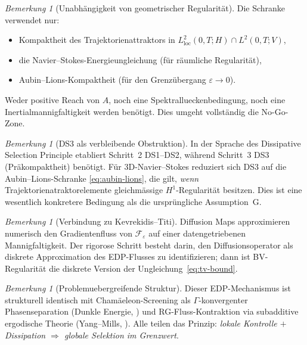 \documentclass[12pt,a4paper]{article}
\theoremstyle{definition}
\theoremstyle{plain}
\theoremstyle{remark}
\newtheorem{remark}[definition]{Bemerkung}
\begin{document}
\begin{remark}[Unabh\"angigkeit von geometrischer Regularit\"at]\label{rem:no-reach-needed}
Die Schranke verwendet nur:
\begin{itemize}
\item Kompaktheit des Trajektorienattraktors in $L^2_{\mathrm{loc}}(0,T;H) \cap L^2(0,T;V)$,
\item die Navier--Stokes-Energieungleichung (f\"ur r\"aumliche Regularit\"at),
\item Aubin--Lions-Kompaktheit (f\"ur den Grenz\"ubergang $\varepsilon \to 0$).
\end{itemize}
Weder positive Reach von $A$, noch eine Spektrallueckenbedingung, noch eine Inertialmannigfaltigkeit werden ben\"otigt. Dies umgeht vollst\"andig die No-Go-Zone.
\end{remark}

\begin{remark}[DS3 als verbleibende Obstruktion]\label{rem:ds3-ns}
In der Sprache des Dissipative Selection Principle \cite{FST-Unified2026} etabliert Schritt~2 DS1--DS2, w\"ahrend Schritt~3 DS3 (Pr\"akompaktheit) ben\"otigt. F\"ur 3D-Navier--Stokes reduziert sich DS3 auf die Aubin--Lions-Schranke \eqref{eq:aubin-lions}, die gilt, \emph{wenn} Trajektorienatraktorelemente gleichm\"assige $H^1$-Regularit\"at besitzen. Dies ist eine wesentlich konkretere Bedingung als die urspr\"ungliche Assumption~G.
\end{remark}

\begin{remark}[Verbindung zu Kevrekidis--Titi]\label{rem:kevrekidis-edp}
Diffusion Maps \cite{KevrekidisTiti2024} approximieren numerisch den Gradientenfluss von $\mathcal{F}_\varepsilon$ auf einer datengetriebenen Mannigfaltigkeit. Der rigorose Schritt besteht darin, den Diffusionsoperator als diskrete Approximation des EDP-Flusses zu identifizieren; dann ist BV-Regularit\"at die diskrete Version der Ungleichung~\eqref{eq:tv-bound}.
\end{remark}

\begin{remark}[Problemuebergreifende Struktur]\label{rem:cross-edp}
Dieser EDP-Mechanismus ist strukturell identisch mit Cham\"aeleon-Screening als $\Gamma$-konvergenter Phasenseparation (Dunkle Energie, \cite{Geiger2026-DE}) und RG-Fluss-Kontraktion via subadditive ergodische Theorie (Yang--Mills, \cite{Geiger2026-YM}). Alle teilen das Prinzip: \emph{lokale Kontrolle $+$ Dissipation $\Rightarrow$ globale Selektion im Grenzwert}.
\end{remark}
\end{document}
